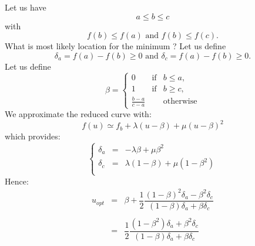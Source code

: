 \documentclass[aps,12pt]{revtex4}
\begin{document}

Let us have 
$$a \leq b \leq c$$ 
with 
$$f(b)\leq f(a) \text{ and } f(b)\leq f(c).$$
What is most likely location for the minimum ?
Let us define $$\delta_a = f(a)-f(b) \geq 0 \text{ and } \delta_c = f(a)-f(b)  \geq 0.$$ 
Let us define 
$$
	\beta = 
	\left\lbrace
	\begin{array}{rcl}
	0 & \text{if} & b\leq a,\\
	1 & \text{if} & b\geq c,\\
	\frac{b-a}{c-a} & & \text{otherwise}
	\end{array}
	\right.
$$
We approximate the reduced curve with:
$$
	f(u) \simeq f_b + \lambda (u-\beta)  + \mu (u-\beta)^2
$$
which provides:
$$
\left\lbrace
\begin{array}{rcl}
	\delta_a & = & -\lambda \beta + \mu \beta^2 \\
	\delta_c & = & \lambda(1-\beta) + \mu (1-\beta^2)\\
\end{array}
\right.
$$
Hence:
$$
\begin{array}{rcl}
	u_{opt} & = & \beta + \dfrac{1}{2} \dfrac{(1-\beta)^2 \delta_a - \beta^2 \delta_c }{(1-\beta)\delta_a + \beta \delta_c}\\
	\\
	 & = & \dfrac{1}{2} \dfrac{(1-\beta^2)\delta_a + \beta^2 \delta_c }{(1-\beta)\delta_a + \beta \delta_c}\\
\end{array}
$$
\end{document}
